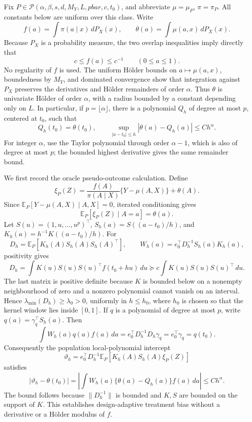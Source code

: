 Fix \(P\in\mathcal P(\alpha,\beta,s,d,M_Y,L,pbar,c,t_0)\), and abbreviate \(\mu=\mu_P\), \(\pi=\pi_P\). All constants below are uniform over this class. Write
\[
f(a)=\int\pi(a\mid x)\,dP_X(x),\qquad \theta(a)=\int\mu(a,x)\,dP_X(x).
\]
Because \(P_X\) is a probability measure, the two overlap inequalities imply directly that
\[
c\le f(a)\le c^{-1}\qquad(0\le a\le1).
\]
No regularity of \(f\) is used. The uniform Hölder bounds on \(a\mapsto\mu(a,x)\), boundedness by \(M_Y\), and dominated convergence show that integration against \(P_X\) preserves the derivatives and Hölder remainders of order \(\alpha\). Thus \(\theta\) is univariate Hölder of order \(\alpha\), with a radius bounded by a constant depending only on \(L\). In particular, if \(p=\lfloor\alpha\rfloor\), there is a polynomial \(Q_h\) of degree at most \(p\), centered at \(t_0\), such that
\[
Q_h(t_0)=\theta(t_0),\qquad \sup_{|a-t_0|\le h}|\theta(a)-Q_h(a)|\le Ch^\alpha.
\]
For integer \(\alpha\), use the Taylor polynomial through order \(\alpha-1\), which is also of degree at most \(p\); the bounded highest derivative gives the same remainder bound.

We first record the oracle pseudo-outcome calculation. Define
\[
\xi_P(Z)=\frac{f(A)}{\pi(A\mid X)}\{Y-\mu(A,X)\}+\theta(A).
\]
Since \(\mathbb E_P[Y-\mu(A,X)\mid A,X]=0\), iterated conditioning gives
\[
\mathbb E_P[\xi_P(Z)\mid A=a]=\theta(a).
\]
Let \(S(u)=(1,u,\ldots,u^p)^\top\), \(S_h(a)=S((a-t_0)/h)\), and \(K_h(a)=h^{-1}K((a-t_0)/h)\). For
\[
D_h=\mathbb E_P[K_h(A)S_h(A)S_h(A)^\top],\qquad
W_h(a)=e_0^\top D_h^{-1}S_h(a)K_h(a),
\]
positivity gives
\[
D_h=\int K(u)S(u)S(u)^\top f(t_0+hu)\,du\succeq c\int K(u)S(u)S(u)^\top\,du.
\]
The last matrix is positive definite because \(K\) is bounded below on a nonempty neighbourhood of zero and a nonzero polynomial cannot vanish on an interval. Hence \(\lambda_{\min}(D_h)\ge\lambda_0>0\), uniformly in \(h\le h_0\), where \(h_0\) is chosen so that the kernel window lies inside \([0,1]\). If \(q\) is a polynomial of degree at most \(p\), write \(q(a)=\gamma_q^\top S_h(a)\). Then
\[
\int W_h(a)q(a)f(a)\,da=e_0^\top D_h^{-1}D_h\gamma_q=e_0^\top\gamma_q=q(t_0).
\]
Consequently the population local-polynomial intercept
\[
\vartheta_h=e_0^\top D_h^{-1}\mathbb E_P[K_h(A)S_h(A)\xi_P(Z)]
\]
satisfies
\[
|\vartheta_h-\theta(t_0)|=\left|\int W_h(a)\{\theta(a)-Q_h(a)\}f(a)\,da\right|\le Ch^\alpha.
\]
The bound follows because \(\|D_h^{-1}\|\) is bounded and \(K,S\) are bounded on the support of \(K\). This establishes design-adaptive treatment bias without a derivative or a Hölder modulus of \(f\).

